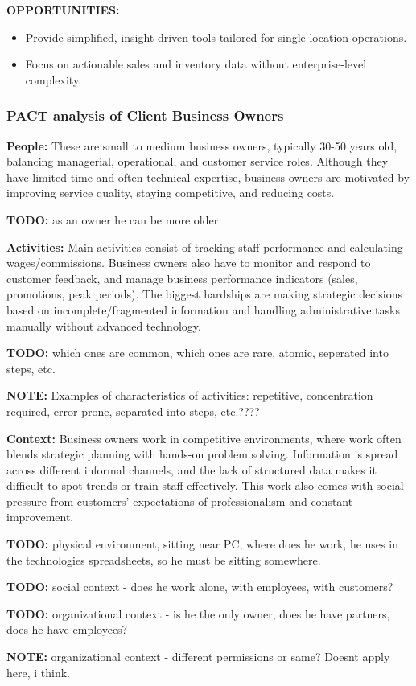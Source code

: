 \documentclass[]{VUMIFTemplateClass}
\newcommand{\noticecomment}[1]{%
    \begin{tcolorbox}[colback=blue!20, colframe=blue!60, arc=0pt, outer arc=0pt, boxrule=1pt, left=3pt, right=3pt, top=3pt, bottom=3pt]
        \textbf{\textcolor{blue!70!black}{NOTE:}} #1
    \end{tcolorbox}
}
\newcommand{\todocomment}[1]{%
    \begin{tcolorbox}[colback=red!20, colframe=red!60, arc=0pt, outer arc=0pt, boxrule=1pt, left=3pt, right=3pt, top=3pt, bottom=3pt]
        \textbf{\textcolor{orange!70!black}{TODO:}} #1
    \end{tcolorbox}
}
\begin{document}
\textbf{OPPORTUNITIES:}
\begin{itemize}
    \item Provide simplified, insight-driven tools tailored for single-location operations.
    \item Focus on actionable sales and inventory data without enterprise-level complexity.
\end{itemize}

\subsubsection{PACT analysis of Client Business Owners}
    \textbf{People:} These are small to medium business owners, typically 30-50
    years old, balancing managerial, operational, and customer service roles.
    Although they have limited time and often technical expertise, business
    owners are motivated by improving service quality, staying competitive, and
    reducing costs.

    \todocomment{as an owner he can be more older}

    \textbf{Activities:} Main activities consist of tracking staff performance
    and calculating wages/commissions. Business owners also have to monitor and
    respond to customer feedback, and manage business performance indicators
    (sales, promotions, peak periods). The biggest hardships are making
    strategic decisions based on incomplete/fragmented information and handling
    administrative tasks manually without advanced technology.
    \todocomment{which ones are common, which ones are rare, atomic, seperated into steps, etc.}
    \noticecomment{Examples of characteristics of activities: repetitive, concentration required, error-prone, separated into steps, etc.????}

    \textbf{Context:} Business owners work in competitive environments, where
    work often blends strategic planning with hands-on problem solving.
    Information is spread across different informal channels, and the lack of
    structured data makes it difficult to spot trends or train staff
    effectively. This work also comes with social pressure from customers'
    expectations of professionalism and constant improvement.
    \todocomment{physical environment, sitting near PC, where does he work, he uses in the technologies spreadsheets, so he must be sitting somewhere.}
    \todocomment{social context - does he work alone, with employees, with customers?}
    \todocomment{organizational context - is he the only owner, does he have partners, does he have employees?}
    \noticecomment{organizational context - different permissions or same? Doesnt apply here, i think.}
\end{document}

